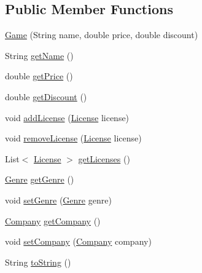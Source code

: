 \subsection*{Public Member Functions}
\begin{DoxyCompactItemize}
\item 
\hyperlink{classes_1_1deusto_1_1server_1_1db_1_1data_1_1_game_aad926d06e556453f4b08efa5a3e620d4}{Game} (String name, double price, double discount)
\item 
String \hyperlink{classes_1_1deusto_1_1server_1_1db_1_1data_1_1_game_af9f6defe43d11cefdef169a6aaa87ae7}{get\+Name} ()
\item 
double \hyperlink{classes_1_1deusto_1_1server_1_1db_1_1data_1_1_game_a1b39bf61a9699d6bdd013e48d1159def}{get\+Price} ()
\item 
double \hyperlink{classes_1_1deusto_1_1server_1_1db_1_1data_1_1_game_a4c75cd53d5bd16c62804ca3779440165}{get\+Discount} ()
\item 
void \hyperlink{classes_1_1deusto_1_1server_1_1db_1_1data_1_1_game_aaa7e3ebbc4cd3b62080b39c98d374424}{add\+License} (\hyperlink{classes_1_1deusto_1_1server_1_1db_1_1data_1_1_license}{License} license)
\item 
void \hyperlink{classes_1_1deusto_1_1server_1_1db_1_1data_1_1_game_a4ca6c0283ef51e95fbed8f52fd76d985}{remove\+License} (\hyperlink{classes_1_1deusto_1_1server_1_1db_1_1data_1_1_license}{License} license)
\item 
List$<$ \hyperlink{classes_1_1deusto_1_1server_1_1db_1_1data_1_1_license}{License} $>$ \hyperlink{classes_1_1deusto_1_1server_1_1db_1_1data_1_1_game_a6da5b38821b5c9bcb71b26721af09bf0}{get\+Licenses} ()
\item 
\hyperlink{classes_1_1deusto_1_1server_1_1db_1_1data_1_1_genre}{Genre} \hyperlink{classes_1_1deusto_1_1server_1_1db_1_1data_1_1_game_a021c30dd22681130bbdb6f2690ba8657}{get\+Genre} ()
\item 
void \hyperlink{classes_1_1deusto_1_1server_1_1db_1_1data_1_1_game_a61d197148280723f018c7ef18e37cb7e}{set\+Genre} (\hyperlink{classes_1_1deusto_1_1server_1_1db_1_1data_1_1_genre}{Genre} genre)
\item 
\hyperlink{classes_1_1deusto_1_1server_1_1db_1_1data_1_1_company}{Company} \hyperlink{classes_1_1deusto_1_1server_1_1db_1_1data_1_1_game_aa772f16e7094839759148d49a4634e82}{get\+Company} ()
\item 
void \hyperlink{classes_1_1deusto_1_1server_1_1db_1_1data_1_1_game_a3699723b19412f250feea6e9c730815c}{set\+Company} (\hyperlink{classes_1_1deusto_1_1server_1_1db_1_1data_1_1_company}{Company} company)
\item 
String \hyperlink{classes_1_1deusto_1_1server_1_1db_1_1data_1_1_game_aae9eb6e19b8f730b9554cfac23c8298b}{to\+String} ()
\end{DoxyCompactItemize}


